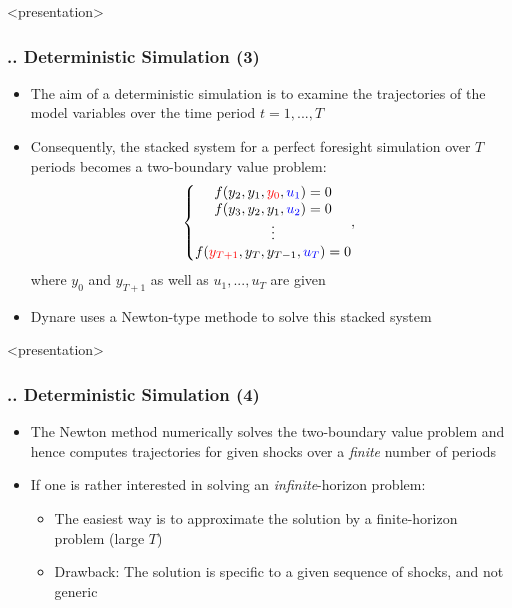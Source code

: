 \documentclass[11pt,aspectratio=169]{beamer}
\begin{document}
\begin{frame}<presentation>
	\frametitle{{\thesection.\thesubsection.\thesubsubsection} Deterministic Simulation (3)}
	\begin{itemize}
		\item The aim of a deterministic simulation is to examine the trajectories of the model variables over the time period $t = 1,...,T$
		\item Consequently, the stacked system for a perfect foresight simulation over $T$ periods becomes a two-boundary value problem: 
		$$\left\{ \begin{matrix} f(y_2,y_1,\mathbin{\textcolor{red}{y_0}},\mathbin{\textcolor{blue}{u_1}})=0 \\ 
		f(y_3,y_2,y_1,\mathbin{\textcolor{blue}{u_2}})=0 \\ 
		\vdots \\ 
		f(\mathbin{\textcolor{red}{y_{T+1}}},y_T,y_{T-1},\mathbin{\textcolor{blue}{u_T}})=0 
		\end{matrix},  \right.$$ 
		where $y_0$ and $y_{T+1}$ as well as $u_1,...,u_T$ are given
		\item Dynare uses a Newton-type methode to solve this stacked system
	\end{itemize}
\end{frame}
\begin{frame}<presentation>
	\frametitle{{\thesection.\thesubsection.\thesubsubsection} Deterministic Simulation (4)}
	\begin{itemize}
		\item The Newton method numerically solves the two-boundary value problem and hence computes trajectories for given shocks over a \textit{finite} number of periods
		\item If one is rather interested in solving an \textit{infinite}-horizon problem:
		\begin{itemize}
			\item The easiest way is to approximate the solution by a finite-horizon problem \linebreak (large $T$)
			\item Drawback: The solution is specific to a given sequence of shocks, and not generic
		\end{itemize} 
	\end{itemize}
\end{frame}
\end{document}
